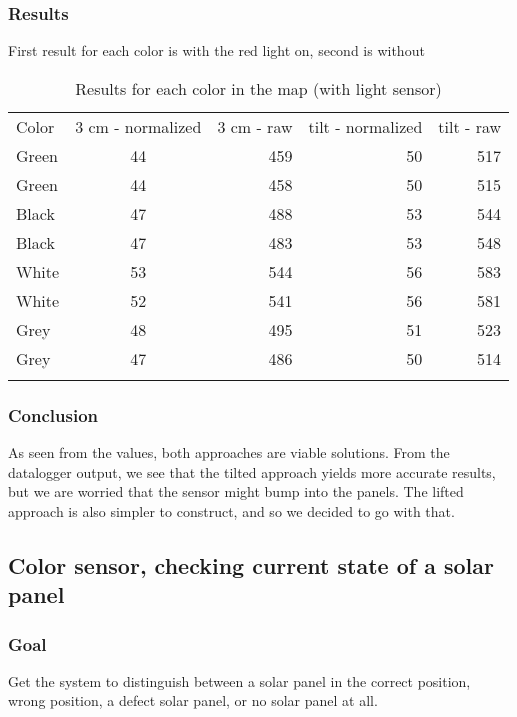 \subsubsection{Results}

First result for each color is with the red light on, second is without

  \begin{longtable}[c]{@{}lcrrr@{}}
    \hline\noalign{\medskip} Color & 3 cm - normalized & 3 cm - raw &
    tilt - normalized & tilt - raw \\\noalign{\medskip}
    \hline\noalign{\medskip} Green & 44 & 459 & 50 & 517
    \\\noalign{\medskip} Green & 44 & 458 & 50 & 515
    \\\noalign{\medskip} Black & 47 & 488 & 53 & 544
    \\\noalign{\medskip} Black & 47 & 483 & 53 & 548
    \\\noalign{\medskip} White & 53 & 544 & 56 & 583
    \\\noalign{\medskip} White & 52 & 541 & 56 & 581
    \\\noalign{\medskip} Grey & 48 & 495 & 51 & 523
    \\\noalign{\medskip} Grey & 47 & 486 & 50 & 514
    \\\noalign{\medskip} \hline
  \caption{Results for each color in the map (with light sensor)}
  \end{longtable}

\subsubsection{Conclusion}

As seen from the values, both approaches are viable solutions. From the
datalogger output, we see that the tilted approach yields more accurate
results, but we are worried that the sensor might bump into the panels.
The lifted approach is also simpler to construct, and so we decided to
go with that.

\subsection{Color sensor, checking current state of a solar panel}

\subsubsection{Goal}

Get the system to distinguish between a solar panel in the correct
position, wrong position, a defect solar panel, or no solar panel at
all.

